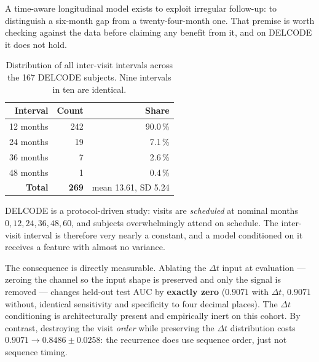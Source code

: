 A time-aware longitudinal model exists to exploit irregular follow-up: to distinguish a
six-month gap from a twenty-four-month one. That premise is worth checking against the data
before claiming any benefit from it, and on DELCODE it does not hold.

\begin{table}[htbp]
  \centering
  \small
  \begin{tabular}{@{}rrr@{}}
    \toprule
    \textbf{Interval} & \textbf{Count} & \textbf{Share} \\
    \midrule
    12 months & 242 & 90.0\,\% \\
    24 months &  19 &  7.1\,\% \\
    36 months &   7 &  2.6\,\% \\
    48 months &   1 &  0.4\,\% \\
    \midrule
    \textbf{Total} & \textbf{269} & mean 13.61, SD 5.24 \\
    \bottomrule
  \end{tabular}
  \caption{Distribution of all inter-visit intervals across the 167 DELCODE subjects.
    Nine intervals in ten are identical.}
  \label{tab:delcode-intervals}
\end{table}

DELCODE is a protocol-driven study: visits are \emph{scheduled} at nominal months
$0, 12, 24, 36, 48, 60$, and subjects overwhelmingly attend on schedule. The inter-visit
interval is therefore very nearly a constant, and a model conditioned on it receives a
feature with almost no variance.

The consequence is directly measurable. Ablating the $\Delta t$ input at evaluation ---
zeroing the channel so the input shape is preserved and only the signal is removed ---
changes held-out test AUC by \textbf{exactly zero} ($0.9071$ with $\Delta t$, $0.9071$
without, identical sensitivity and specificity to four decimal places). The $\Delta t$
conditioning is architecturally present and empirically inert on this cohort. By contrast,
destroying the visit \emph{order} while preserving the $\Delta t$ distribution costs
$0.9071 \rightarrow 0.8486 \pm 0.0258$: the recurrence does use sequence order, just not
sequence timing.


